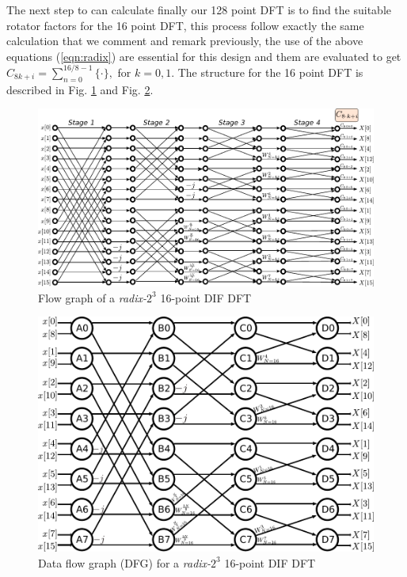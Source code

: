 \documentclass[journal,comsoc]{IEEEtran}
\begin{document}
The next step to can calculate finally our 128 point DFT is to find the suitable rotator factors for the 16 point DFT, this process follow exactly the same calculation that we comment and remark previously, the use of the above equations (\ref{eqn:radix}) are essential for this design and them are evaluated to get $C_{8k+i} = \sum_{n=0}^{16/8-1} \{ \cdot \}, $ for $k=0,1$. The structure for the 16 point DFT is described in Fig. \ref{fig:16puntosradix8conexion} and Fig. \ref{fig:16puntosradix8burbujas}. 
\begin{figure}[h!]
	\centering
	\includegraphics[width=\linewidth]{Diagramas/miSeccionFiguras/16PuntosRadix8Conexion.pdf}
	\caption{Flow graph of a \textit{radix-}$2^3$ 16-point DIF DFT}
	\label{fig:16puntosradix8conexion}
\end{figure}
\begin{figure}[h!]
	\centering
	\includegraphics[width=\linewidth]{Diagramas/miSeccionFiguras/16PuntosRadix8Burbujas.pdf}
	\caption{Data flow graph (DFG) for a \textit{radix-}$2^3$ 16-point DIF DFT}
	\label{fig:16puntosradix8burbujas}
\end{figure}
\end{document}
